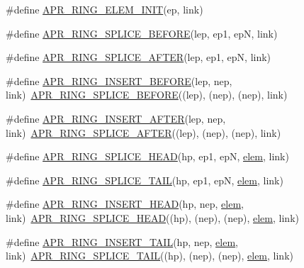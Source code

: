 \begin{DoxyCompactItemize}
\item 
\#define \hyperlink{group__apr__ring_gae5048ecda4b26b012ee93c2c830058cb}{A\+P\+R\+\_\+\+R\+I\+N\+G\+\_\+\+E\+L\+E\+M\+\_\+\+I\+N\+IT}(ep,  link)
\item 
\#define \hyperlink{group__apr__ring_ga438e7369e650ee07ac98ed0731589750}{A\+P\+R\+\_\+\+R\+I\+N\+G\+\_\+\+S\+P\+L\+I\+C\+E\+\_\+\+B\+E\+F\+O\+RE}(lep,  ep1,  epN,  link)
\item 
\#define \hyperlink{group__apr__ring_ga53e6564eba59d7e734a0ce03cb418a42}{A\+P\+R\+\_\+\+R\+I\+N\+G\+\_\+\+S\+P\+L\+I\+C\+E\+\_\+\+A\+F\+T\+ER}(lep,  ep1,  epN,  link)
\item 
\#define \hyperlink{group__apr__ring_ga76f9a04f932b3377073fa4e30d745564}{A\+P\+R\+\_\+\+R\+I\+N\+G\+\_\+\+I\+N\+S\+E\+R\+T\+\_\+\+B\+E\+F\+O\+RE}(lep,  nep,  link)~\hyperlink{group__apr__ring_ga438e7369e650ee07ac98ed0731589750}{A\+P\+R\+\_\+\+R\+I\+N\+G\+\_\+\+S\+P\+L\+I\+C\+E\+\_\+\+B\+E\+F\+O\+RE}((lep), (nep), (nep), link)
\item 
\#define \hyperlink{group__apr__ring_ga40453637d00c853f3a212a30c1f2cb41}{A\+P\+R\+\_\+\+R\+I\+N\+G\+\_\+\+I\+N\+S\+E\+R\+T\+\_\+\+A\+F\+T\+ER}(lep,  nep,  link)~\hyperlink{group__apr__ring_ga53e6564eba59d7e734a0ce03cb418a42}{A\+P\+R\+\_\+\+R\+I\+N\+G\+\_\+\+S\+P\+L\+I\+C\+E\+\_\+\+A\+F\+T\+ER}((lep), (nep), (nep), link)
\item 
\#define \hyperlink{group__apr__ring_ga592e71a7cf219fc70f4fc47c60ef4c64}{A\+P\+R\+\_\+\+R\+I\+N\+G\+\_\+\+S\+P\+L\+I\+C\+E\+\_\+\+H\+E\+AD}(hp,  ep1,  epN,  \hyperlink{structelem}{elem},  link)
\item 
\#define \hyperlink{group__apr__ring_ga51e02e214fb6e218f45ff23cbd1f7abc}{A\+P\+R\+\_\+\+R\+I\+N\+G\+\_\+\+S\+P\+L\+I\+C\+E\+\_\+\+T\+A\+IL}(hp,  ep1,  epN,  \hyperlink{structelem}{elem},  link)
\item 
\#define \hyperlink{group__apr__ring_gad59352546dc9253c0057ad43cf728a63}{A\+P\+R\+\_\+\+R\+I\+N\+G\+\_\+\+I\+N\+S\+E\+R\+T\+\_\+\+H\+E\+AD}(hp,  nep,  \hyperlink{structelem}{elem},  link)~\hyperlink{group__apr__ring_ga592e71a7cf219fc70f4fc47c60ef4c64}{A\+P\+R\+\_\+\+R\+I\+N\+G\+\_\+\+S\+P\+L\+I\+C\+E\+\_\+\+H\+E\+AD}((hp), (nep), (nep), \hyperlink{structelem}{elem}, link)
\item 
\#define \hyperlink{group__apr__ring_ga235311035184125d72ce0689c9949a3e}{A\+P\+R\+\_\+\+R\+I\+N\+G\+\_\+\+I\+N\+S\+E\+R\+T\+\_\+\+T\+A\+IL}(hp,  nep,  \hyperlink{structelem}{elem},  link)~\hyperlink{group__apr__ring_ga51e02e214fb6e218f45ff23cbd1f7abc}{A\+P\+R\+\_\+\+R\+I\+N\+G\+\_\+\+S\+P\+L\+I\+C\+E\+\_\+\+T\+A\+IL}((hp), (nep), (nep), \hyperlink{structelem}{elem}, link)

\end{DoxyCompactItemize}
